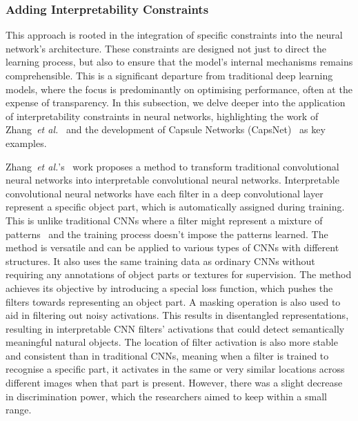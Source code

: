 \subsubsection{Adding Interpretability Constraints}
\label{sec:Constraints}

This approach is rooted in the integration of specific constraints into the neural network's architecture. These constraints are designed not just to direct the learning process, but also to ensure that the model's internal mechanisms remains comprehensible. This is a significant departure from traditional deep learning models, where the focus is predominantly on optimising performance, often at the expense of transparency. In this subsection, we delve deeper into the application of interpretability constraints in neural networks, highlighting the work of Zhang~\textit{et al.}~\cite{ZhangWZ18a} and the development of Capsule Networks (CapsNet)~\cite{SabourFH17} as key examples.


Zhang~\textit{et al.}'s~\cite{ZhangWZ18a} work proposes a method to transform traditional convolutional neural networks into interpretable convolutional neural networks. Interpretable convolutional neural networks have each filter in a deep convolutional layer represent a specific object part, which is automatically assigned during training. This is unlike traditional CNNs where a filter might represent a mixture of patterns~\cite{NguyenYC16} and the training process doesn't impose the patterns learned. The method is versatile and can be applied to various types of CNNs with different structures. It also uses the same training data as ordinary CNNs without requiring any annotations of object parts or textures for supervision. The method achieves its objective by introducing a special loss function, which pushes the filters towards representing an object part. A masking operation is also used to aid in filtering out noisy activations. This results in disentangled representations, resulting in interpretable CNN filters' activations that could detect semantically meaningful natural objects. The location of filter activation is also more stable and consistent than in traditional CNNs, meaning when a filter is trained to recognise a specific part, it activates in the same or very similar locations across different images when that part is present. However, there was a slight decrease in discrimination power, which the researchers aimed to keep within a small range.

